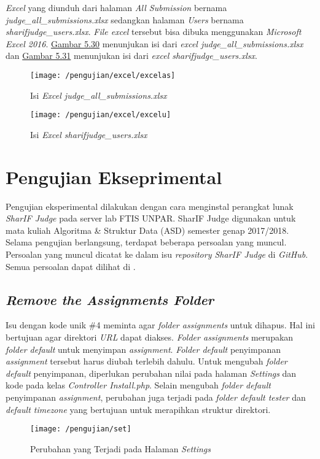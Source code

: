 	\textit{Excel} yang diunduh dari halaman \textit{All Submission} bernama \textit{judge\_all\_submissions.xlsx} sedangkan halaman \textit{Users} bernama \textit{sharifjudge\_users.xlsx}. \textit{File excel} tersebut bisa dibuka menggunakan \textit{Microsoft Excel 2016}. \hyperref[fig:excelas]{Gambar 5.30} menunjukan isi dari \textit{excel judge\_all\_submissions.xlsx} dan \hyperref[fig:excelu]{Gambar 5.31} menunjukan isi dari \textit{excel sharifjudge\_users.xlsx}.
	\begin{figure}[H]
		\centering  
		\texttt{[image: /pengujian/excel/excelas]}  
		\caption[Isi \textit{Excel judge\_all\_submissions.xlsx}]{Isi \textit{Excel judge\_all\_submissions.xlsx}} 
		\label{fig:excelas} 
	\end{figure}

	\begin{figure}[H]
		\centering  
		\texttt{[image: /pengujian/excel/excelu]}  
		\caption[Isi \textit{Excel sharifjudge\_users.xlsx}]{Isi \textit{Excel sharifjudge\_users.xlsx}} 
		\label{fig:excelu} 
	\end{figure}
	
\section{Pengujian Ekseprimental}
Pengujian eksperimental dilakukan dengan cara menginstal perangkat lunak \textit{SharIF Judge} pada server lab FTIS UNPAR. SharIF Judge digunakan untuk mata kuliah Algoritma \& Struktur Data (ASD) semester genap 2017/2018. Selama pengujian berlangsung, terdapat beberapa persoalan yang muncul. Persoalan yang muncul dicatat ke dalam isu \textit{repository SharIF Judge} di \textit{GitHub}. Semua persoalan dapat dilihat di .

	\subsection{\textit{Remove the Assignments Folder}}
	Isu dengan kode unik \#4 meminta agar \textit{folder assignments} untuk dihapus. Hal ini bertujuan agar direktori \textit{URL}  dapat diakses. \textit{Folder assignments} merupakan \textit{folder default} untuk menyimpan \textit{assignment}. \textit{Folder default} penyimpanan \textit{assignment} tersebut harus diubah terlebih dahulu. Untuk mengubah \textit{folder default} penyimpanan, diperlukan perubahan nilai pada halaman \textit{Settings} dan kode pada kelas \textit{Controller Install.php}. Selain mengubah \textit{folder default} penyimpanan \textit{assignment}, perubahan juga terjadi pada \textit{folder default tester} dan \textit{default timezone} yang bertujuan untuk merapihkan struktur direktori.
	\begin{figure}[H]
		\centering  
		\texttt{[image: /pengujian/set]}  
		\caption[Perubahan yang Terjadi pada Halaman \textit{Settings}]{Perubahan yang Terjadi pada Halaman \textit{Settings}} 
		\label{fig:set} 
	\end{figure}
	
